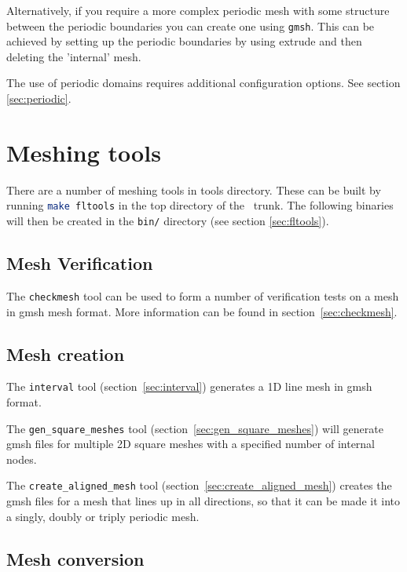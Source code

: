 Alternatively, if you require a more complex periodic mesh with some structure between the periodic 
boundaries you can create one using \lstinline[language=Bash]{gmsh}. This can be achieved by 
setting up the periodic boundaries by using extrude and then deleting the 'internal' mesh.

The use of periodic domains requires additional configuration options. See
section \ref{sec:periodic}.

\section{Meshing tools}
\label{sec:meshing_tools}

There are a number of meshing tools in tools directory. These can be built by running 
\lstinline[language = bash]+make fltools+ in the top directory of the \fluidity\ trunk.
The following binaries will then be created in the \lstinline+bin/+ directory (see section \ref{sec:fltools}).

\subsection{Mesh Verification}

The \lstinline[language = Bash]+checkmesh+ tool can be used to form a number of verification tests on a mesh
in gmsh mesh format. More information can be found in section~\ref{sec:checkmesh}.

\subsection{Mesh creation}
The \lstinline[language = bash]+interval+ tool (section~\ref{sec:interval}) generates a 1D line mesh in gmsh format.

The \lstinline[language = bash]+gen_square_meshes+ tool (section~\ref{sec:gen_square_meshes})  will generate gmsh files for multiple 2D square meshes with a specified number of internal nodes.

The \lstinline[language = bash]+create_aligned_mesh+ tool (section~\ref{sec:create_aligned_mesh}) creates the gmsh files for a mesh that lines up in all directions, so that it can be made it into a singly, doubly or triply periodic mesh.

\subsection{Mesh conversion}

